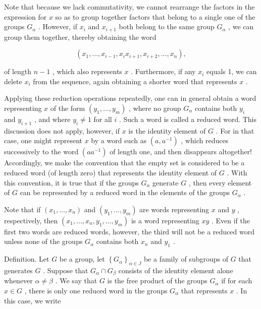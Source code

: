 \documentclass[10pt]{article}
\begin{document}
Note that because we lack commutativity, we cannot rearrange the factors in the expression for \(x\) so as to group together factors that belong to a single one of the groups \({G}_{\alpha }\) . However, if \({x}_{i}\) and \({x}_{i + 1}\) both belong to the same group \({G}_{\alpha }\) , we can group them together, thereby obtaining the word

\[
\left( {{x}_{1},\ldots ,{x}_{i - 1},{x}_{i}{x}_{i + 1},{x}_{i + 2},\ldots ,{x}_{n}}\right) ,
\]

of length \(n - 1\) , which also represents \(x\) . Furthermore, if any \({x}_{i}\) equals 1, we can delete \({x}_{i}\) from the sequence, again obtaining a shorter word that represents \(x\) .

Applying these reduction operations repeatedly, one can in general obtain a word representing \(x\) of the form \(\left( {{y}_{1},\ldots ,{y}_{m}}\right)\) , where no group \({G}_{\alpha }\) contains both \({y}_{i}\) and \({y}_{i + 1}\) , and where \({y}_{i} \neq  1\) for all \(i\) . Such a word is called a reduced word. This discussion does not apply, however, if \(x\) is the identity element of \(G\) . For in that case, one might represent \(x\) by a word such as \(\left( {a,{a}^{-1}}\right)\) , which reduces successively to the word \(\left( {a{a}^{-1}}\right)\) of length one, and then disappears altogether! Accordingly, we make the convention that the empty set is considered to be a reduced word (of length zero) that represents the identity element of \(G\) . With this convention, it is true that if the groups \({G}_{\alpha }\) generate \(G\) , then every element of \(G\) can be represented by a reduced word in the elements of the groups \({G}_{\alpha }\) .

Note that if \(\left( {{x}_{1},\ldots ,{x}_{n}}\right)\) and \(\left( {{y}_{1},\ldots ,{y}_{m}}\right)\) are words representing \(x\) and \(y\) , respectively, then \(\left( {{x}_{1},\ldots ,{x}_{n},{y}_{1},\ldots ,{y}_{m}}\right)\) is a word representing \({xy}\) . Even if the first two words are reduced words, however, the third will not be a reduced word unless none of the groups \({G}_{\alpha }\) contains both \({x}_{n}\) and \({y}_{1}\) .

Definition. Let \(G\) be a group, let \({\left\{  {G}_{\alpha }\right\}  }_{\alpha  \in  J}\) be a family of subgroups of \(G\) that generates \(G\) . Suppose that \({G}_{\alpha } \cap  {G}_{\beta }\) consists of the identity element alone whenever \(\alpha  \neq  \beta\) . We say that \(G\) is the free product of the groups \({G}_{\alpha }\) if for each \(x \in  G\) , there is only one reduced word in the groups \({G}_{\alpha }\) that represents \(x\) . In this case, we write
\end{document}
